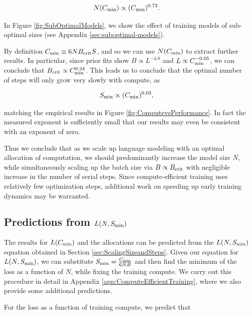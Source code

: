 \begin{equation}
N(C_{\rm min}) \propto (C_{\rm min})^{0.73}.
\end{equation}

In Figure \ref{fig:SubOptimalModels}, we show the effect of training models of sub-optimal sizes (see Appendix \ref{sec:suboptimal-models}).

By definition $C_{\rm min} \equiv 6 N B_{\rm crit} S$, and so we can use $N(C_{\rm min})$ to extract further results.  In particular, since prior fits show $B \propto L^{-4.8}$ and $L \propto C_{\rm min}^{-0.05}$, we can conclude that $B_{\rm crit} \propto C_{\rm min}^{0.24}$.  This leads us to conclude that the optimal number of steps will only grow very slowly with compute, as

\begin{equation}
S_{\rm min} \propto (C_{\rm min})^{0.03},
\end{equation}

matching the empirical results in Figure \ref{fig:ComputevsPerformance}.  In fact the measured exponent is sufficiently small that our results may even be consistent with an exponent of zero.  

Thus we conclude that as we scale up language modeling with an optimal allocation of computation, we should predominantly increase the model size $N$, while simultaneously scaling up the batch size  via $B \propto B_{\rm crit}$ with negligible increase in the number of serial steps.  Since compute-efficient training uses relatively few optimization steps, additional work on speeding up early training dynamics may be warranted.

\subsection{Predictions from $L(N, S_{\rm min})$}

The results for $L(C_{\rm min})$ and the allocations can be predicted  from the $L(N, S_{\rm min})$ equation obtained in Section \ref{sec:ScalingSizeandSteps}.  Given our  equation for $L(N, S_{\rm min})$, we can substitute $S_{\rm min} = \frac{C_{\rm min}}{6 N B}$ and then find the minimum of the loss as a function of $N$, while fixing the training compute. We carry out this procedure in detail  in Appendix \ref{app:ComputeEfficientTraining}, where we also provide some additional predictions.  

For the loss as a function of training compute, we predict that

